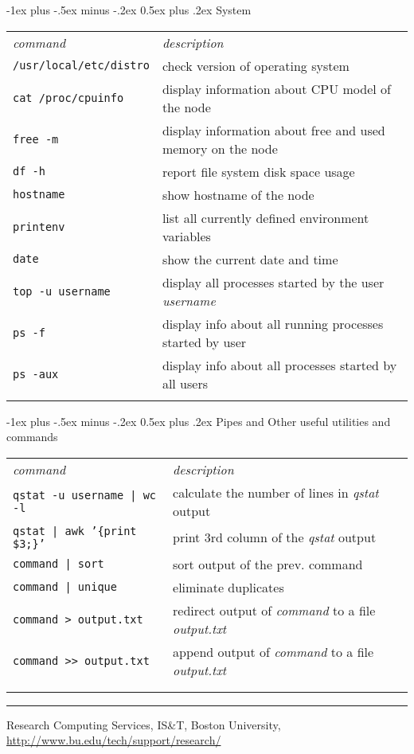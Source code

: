 \documentclass[10pt,landscape]{article}
\makeatletter
\renewcommand{\section}{\@startsection{section}{1}{0mm}%
                                {-1ex plus -.5ex minus -.2ex}%
                                {0.5ex plus .2ex}%
                                {\normalfont\large\bfseries}}
\makeatother
\begin{document}
\begin{multicols}{2}
\section{System}
\begin{tabular}{ll}

\emph{command} & \emph{description} \\
\texttt{/usr/local/etc/distro} & check version of operating system\\
\texttt{cat /proc/cpuinfo} & display information about CPU model of the node \\
\texttt{free -m} & display information about free and used memory on the node  \\
\texttt{df -h} & report file system disk space usage \\
\texttt{hostname} & show hostname of the node  \\
\texttt{printenv} & list all currently defined environment variables  \\
\texttt{date} & show the current date and time  \\
\texttt{top -u username} & display all processes started by the user \textit{username} \\
\texttt{ps -f} & display info about all running processes started by user  \\
\texttt{ps -aux} & display info about all processes started by all users  \\
\\
\end{tabular}

\section{Pipes and Other useful utilities and commands}
\begin{tabular}{ll}

\emph{command} & \emph{description} \\
\texttt{qstat -u username | wc -l} & calculate the number of lines in \textit{qstat} output\\
\texttt{qstat | awk '\{print \$3;\}'} & print 3rd column of the \textit{qstat} output\\
\texttt{command | sort} & sort output of the prev. command\\
\texttt{command | unique} & eliminate duplicates\\
\texttt{command > output.txt} & redirect output of \textit{command} to a file \textit{output.txt}\\
\texttt{command >> output.txt} & append output of \textit{command} to a file \textit{output.txt}\\
\\\\
\end{tabular}

\vskip 1in

\hrule
\vskip 0.1in
Research Computing Services, IS\&T, Boston University,
\href{http://www.bu.edu/tech/support/research/}{http://www.bu.edu/tech/support/research/}
\end{multicols}
\end{document}
